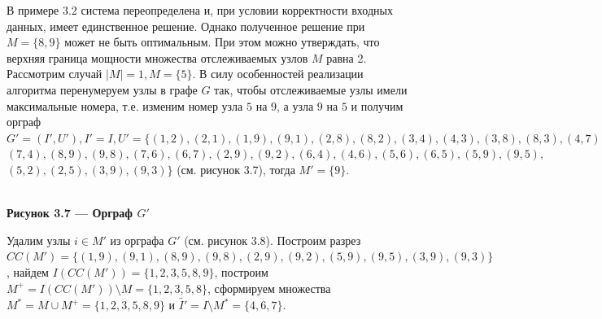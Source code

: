 \documentclass[14pt]{extarticle}%
\begin{document}
 В примере 3.2 система переопределена и, при условии корректности входных данных, имеет единственное решение. Однако полученное решение при $M=\{8,9\}$ может не быть оптимальным. При этом можно утверждать, что верхняя граница мощности множества отслеживаемых узлов $M$ равна 2. Рассмотрим случай $|M|=1, M=\{5\}$. В силу особенностей реализации алгоритма перенумеруем узлы в графе $G$ так, чтобы отслеживаемые узлы имели максимальные номера, т.е. изменим номер узла $5$ на $9$, а узла $9$ на $5$ и получим орграф $G'=(I',U'), I'=I,
U'=\{(1 , 2), (2 , 1), (1 , 9), (9 , 1), (2 , 8), (8 , 2), (3 , 4), (4 , 3), (3 , 8),  (8 , 3), (4 , 7),$\\
$ (7 , 4), (8 , 9), (9 , 8), (7 , 6), (6 , 7), (2 , 9), (9 , 2), (6 , 4), (4 , 6), (5 , 6), (6 , 5), (5 , 9), (9 , 5),$\\
$ (5 , 2), (2 , 5), (3 , 9), (9 , 3)\}$ (см. рисунок 3.7), тогда $M'=\{9\}$.

\begin{center}
\\
\textbf{Рисунок 3.7 --- Орграф $G'$}
\end{center}

Удалим узлы $i\in M'$ из орграфа $G'$ (см. рисунок 3.8). Построим разрез $CC(M')=\{(1 , 9), (9 , 1), (8 , 9), (9 , 8), (2 , 9), (9 , 2), (5 , 9), (9 , 5), (3 , 9), (9 , 3)\}$, найдем $I(CC(M'))=\{1,2,3,5,8,9\}$, построим $M^+=I(CC(M'))\setminus M=\{1,2,3,5,8\}$, сформируем множества $M^*=M\cup M^+=\{1,2,3,5,8,9\}$ и $\widetilde{I'}=I\setminus M^*=\{4,6,7\}$.
\end{document}
